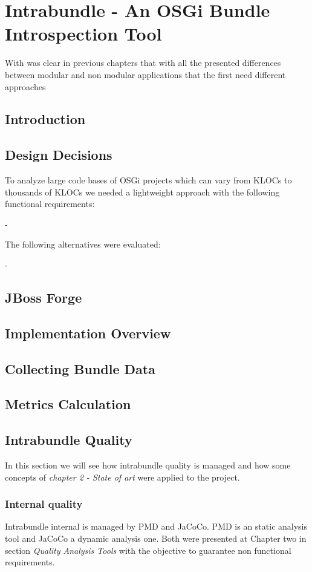 \chapter{Intrabundle - An OSGi Bundle Introspection Tool}

With was clear in previous chapters that with all the presented differences between modular and non modular applications that the first need different approaches 

\section{Introduction}

\section{Design Decisions}
To analyze large code bases of OSGi projects which can vary from KLOCs to thousands of KLOCs we needed a lightweight approach with the following functional requirements:

- 

The following alternatives were evaluated:

-

\section{JBoss Forge}

\section{Implementation Overview}

\section{Collecting Bundle Data}

\section{Metrics Calculation}

\section{Intrabundle Quality}
In this section we will see how intrabundle quality is managed and how some concepts of \textit{chapter 2 - State of art} were applied to the project.
\subsection{Internal quality}
Intrabundle internal is managed by PMD and JaCoCo. PMD is an static analysis tool and JaCoCo a dynamic analysis one. Both were presented at Chapter two in section \textit{Quality Analysis Tools} with the objective to guarantee non functional requirements.

